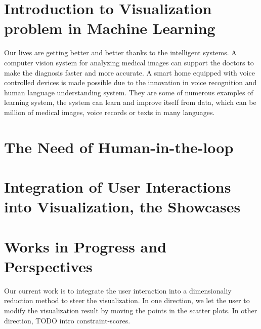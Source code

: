 \section{Introduction to Visualization problem in Machine Learning}

Our lives are getting better and better thanks to the intelligent systems.
A computer vision system for analyzing medical images can support the doctors to make the diagnosis faster and more accurate.
A smart home equipped with voice controlled devices is made possible due to the innovation in voice recognition and human language understanding system.
They are some of numerous examples of learning system, the system can learn and improve itself from data, which can be million of medical images, voice records or texts in many languages.







\section{The Need of Human-in-the-loop}





\section{Integration of User Interactions into Visualization, the Showcases}



\section{Works in Progress and Perspectives}

Our current work is to integrate the user interaction into a dimensionaliy reduction method to steer the visualization.
In one direction, we let the user to modify the visualization result by moving the points in the scatter plots.
In other direction, TODO intro constraint-scores.

